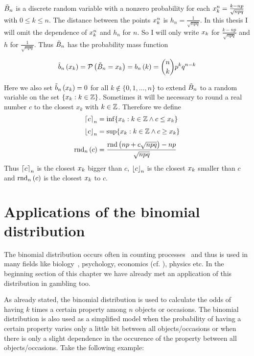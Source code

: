 $\BBs$ is a discrete random variable with a nonzero probability for each $\x[k]^n = \frac{k-np}{\sqrt{npq}}$ with $0\le k\le n$. The distance between the points $\x[k]^n$  is $h_n = \frac{1}{\sqrt{npq}}$. In this thesis I will omit the dependence of $\x^n$ and $h_n$ for $n$. So I will only write $\x$ for $\frac{k-np}{\sqrt{npq}}$ and $h$ for $\frac 1{\sqrt{npq}}$. Thus $\BBs$ has the probability mass function

\begin{align}
  \bb{\x[k]} = \P{\BBs = \x[k]} = \b{k} = \binom nk p^kq^{n-k}
\end{align}

Here we also set $\bb{\x[k]}=0$ for all $k\notin\{0,1,\ldots,n\}$ to extend $\BBs$ to a random variable on the set $\{\x[k] : k\in\Z\}$. Sometimes it will be necessary to round a real number $c$ to the closest $x_k$ with $k\in\Z$. Therefore we define
\begin{align}
  \xup{c} &= \inf \{ x_k : k\in\Z \land c \le x_k \} \nl
  \xdown{c} &= \sup \{ x_k : k \in \Z \land c \ge x_k \} \nl
  \xrnd{c} &= \frac{\rnd{np+c\sqrt{npq}}-np}{\sqrt{npq}}
\end{align}
Thus $\xup{c}$ is the closest $\x$ bigger than $c$, $\xdown{c}$ is the closest $\x$ smaller than $c$ and $\xrnd{c}$ is the closest $\x$ to $c$.

\section{Applications of the binomial distribution}

The binomial distribution occurs often in counting processes~\cite[p. 138]{henze} and thus is used in many fields like biology~\cite[p. 146]{henze}, psychology, economics (cf. \cite[p. 59]{irle}), physics etc. In the beginning section of this chapter we have already met an application of this distribution in gambling too.


As already stated, the binomial distribution is used to calculate the odds of having $k$ times a certain property among $n$ objects or occasions. The binomial distribution is also used as a simplified model when the probability of having a certain property varies only a little bit between all objects/occasions or when there is only a slight dependence in the occurence of the property between all objects/occasions. Take the following example:

